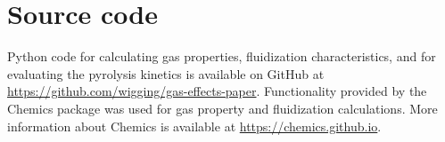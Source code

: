 
\section{Source code}

Python code for calculating gas properties, fluidization characteristics, and for evaluating the pyrolysis kinetics is available on GitHub at \url{https://github.com/wigging/gas-effects-paper}. Functionality provided by the Chemics package was used for gas property and fluidization calculations. More information about Chemics is available at \url{https://chemics.github.io}.
